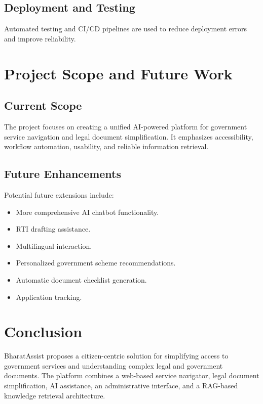 \documentclass[12pt,a4paper]{report}
\begin{document}
\section{Deployment and Testing}

Automated testing and CI/CD pipelines are used to reduce deployment errors and improve reliability.

\chapter{Project Scope and Future Work}

\section{Current Scope}

The project focuses on creating a unified AI-powered platform for government service navigation and legal document simplification. It emphasizes accessibility, workflow automation, usability, and reliable information retrieval.

\section{Future Enhancements}

Potential future extensions include:

\begin{itemize}[leftmargin=*]
    \item More comprehensive AI chatbot functionality.
    \item RTI drafting assistance.
    \item Multilingual interaction.
    \item Personalized government scheme recommendations.
    \item Automatic document checklist generation.
    \item Application tracking.
\end{itemize}

\chapter{Conclusion}

BharatAssist proposes a citizen-centric solution for simplifying access to government services and understanding complex legal and government documents. The platform combines a web-based service navigator, legal document simplification, AI assistance, an administrative interface, and a RAG-based knowledge retrieval architecture.
\end{document}
